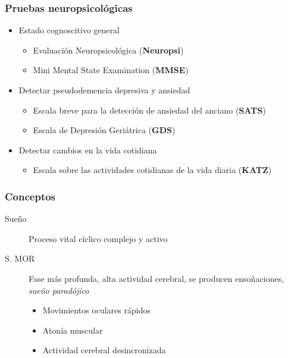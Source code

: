 \documentclass[serif,mathserif,professionalfont]{beamer}
\begin{document}
\begin{frame}\frametitle{Pruebas neuropsicológicas}
\begin{itemize}
\item Estado cognoscitivo general
\begin{itemize}
\item {Evaluación Neuropsicológica (\textbf{Neuropsi})} %
\item {Mini Mental State Examination (\textbf{MMSE})} %
\end{itemize}
\item Detectar pseudodemencia depresiva y ansiedad
\begin{itemize}
\item {Escala breve para la detección de ansiedad del anciano (\textbf{SATS})} %
\item {Escala de Depresión Geriátrica (\textbf{GDS})} %
\end{itemize}
\item Detectar cambios en la vida cotidiana
\begin{itemize}
\item {Escala sobre las actividades cotidianas de la vida diaria (\textbf{KATZ})} %
\end{itemize}
\end{itemize}
\end{frame}

\begin{frame}
\frametitle{Conceptos}
\begin{description}
\item[Sue\~no] Proceso vital c\'iclico complejo y activo
\item[S. MOR] Fase m\'as profunda, alta actividad cerebral, se producen enso\~naciones, 
\textit{sue\~no parad\'ojico}
\begin{itemize}
\item Movimientos oculares r\'apidos
\item Aton\'ia muscular
\item Actividad cerebral desincronizada
\end{itemize}
\end{description}
\end{frame}
\end{document}
